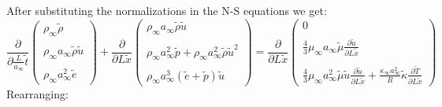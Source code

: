 \documentclass[11pt, a4paper]{article}
\newcommand{\parder}[2]{\frac{\partial {#1}}{\partial {#2}}}
\begin{document}
After substituting the normalizations in the N-S equations we get:
\begin{equation}
    \parder{}{\displaystyle\frac{L}{a_\infty}\tilde{t}}\begin{pmatrix}
        \rho_\infty\tilde{\rho} \\\\
        \rho_\infty a_\infty\tilde{\rho}\tilde{u} \\\\
        \rho_\infty a_\infty^2\tilde{e}
    \end{pmatrix}+\parder{}{L\tilde{x}}\begin{pmatrix}
        \rho_\infty a_\infty\tilde{\rho}\tilde{u} \\\\
        \rho_\infty a_\infty^2\tilde{p}+\rho_\infty a_\infty^2\tilde{\rho}\tilde{u}^2 \\\\
        \rho_\infty a_\infty^3\left(\tilde{e}+\tilde{p}\right)\tilde{u}
    \end{pmatrix}=\parder{}{L\tilde{x}}\begin{pmatrix}
        0 \\\\
        \displaystyle\frac{4}{3}\mu_\infty a_\infty\tilde{\mu} \parder{\tilde{u}}{L\tilde{x}} \\\\
        \displaystyle\frac{4}{3}\mu_\infty a_\infty^2\tilde{\mu}\tilde{u}\parder{\tilde{u}}{L\tilde{x}}+\frac{\kappa_\infty a_\infty^2}{R}\tilde{\kappa}\parder{\tilde{T}}{L\tilde{x}}
    \end{pmatrix}
\end{equation}
Rearranging:
\end{document}
